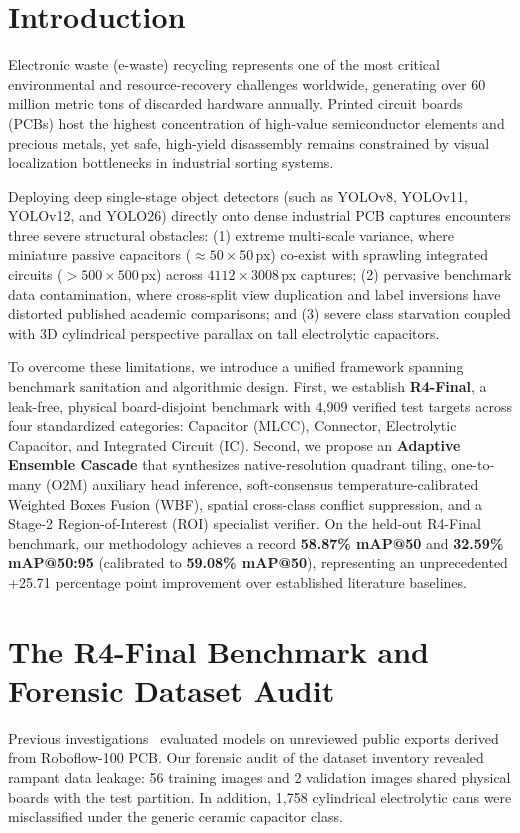 \section{Introduction}
\label{sec:intro}
Electronic waste (e-waste) recycling represents one of the most critical environmental and resource-recovery challenges worldwide, generating over 60 million metric tons of discarded hardware annually. Printed circuit boards (PCBs) host the highest concentration of high-value semiconductor elements and precious metals, yet safe, high-yield disassembly remains constrained by visual localization bottlenecks in industrial sorting systems. 

Deploying deep single-stage object detectors (such as YOLOv8, YOLOv11, YOLOv12, and YOLO26) directly onto dense industrial PCB captures encounters three severe structural obstacles: (1) extreme multi-scale variance, where miniature passive capacitors ($\approx 50 \times 50$\,px) co-exist with sprawling integrated circuits ($>500 \times 500$\,px) across $4112 \times 3008$\,px captures; (2) pervasive benchmark data contamination, where cross-split view duplication and label inversions have distorted published academic comparisons; and (3) severe class starvation coupled with 3D cylindrical perspective parallax on tall electrolytic capacitors.

To overcome these limitations, we introduce a unified framework spanning benchmark sanitation and algorithmic design. First, we establish \textbf{R4-Final}, a leak-free, physical board-disjoint benchmark with 4,909 verified test targets across four standardized categories: Capacitor (MLCC), Connector, Electrolytic Capacitor, and Integrated Circuit (IC). Second, we propose an \textbf{Adaptive Ensemble Cascade} that synthesizes native-resolution quadrant tiling, one-to-many (O2M) auxiliary head inference, soft-consensus temperature-calibrated Weighted Boxes Fusion (WBF), spatial cross-class conflict suppression, and a Stage-2 Region-of-Interest (ROI) specialist verifier. On the held-out R4-Final benchmark, our methodology achieves a record \textbf{58.87\% mAP@50} and \textbf{32.59\% mAP@50:95} (calibrated to \textbf{59.08\% mAP@50}), representing an unprecedented +25.71 percentage point improvement over established literature baselines.

\section{The R4-Final Benchmark and Forensic Dataset Audit}
\label{sec:dataset}
Previous investigations~\cite{zhou2026information} evaluated models on unreviewed public exports derived from Roboflow-100 PCB. Our forensic audit of the dataset inventory revealed rampant data leakage: 56 training images and 2 validation images shared physical boards with the test partition. In addition, 1,758 cylindrical electrolytic cans were misclassified under the generic ceramic capacitor class.

